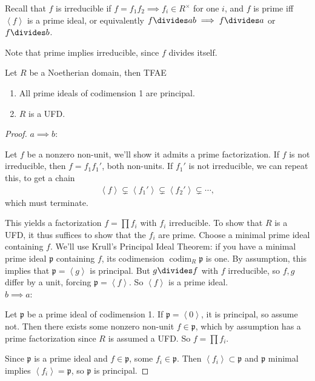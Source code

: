 Recall that \(f\) is irreducible if
\(f = f_1 f_2 \implies f_i \in R^{\times}\) for one \(i\), and \(f\) is
prime iff \(\left\langle{f}\right\rangle\) is a prime ideal, or
equivalently \(f\divides ab \implies f\divides a\) or \(f\divides b\).

Note that prime implies irreducible, since \(f\) divides itself.

\begin{proposition}[?]

Let \(R\) be a Noetherian domain, then TFAE

\begin{enumerate}
\def\labelenumi{\alph{enumi}.}
\item
  All prime ideals of codimension 1 are principal.
\item
  \(R\) is a UFD.
\end{enumerate}

\end{proposition}

\begin{proof}

\(a\implies b\):

Let \(f\) be a nonzero non-unit, we'll show it admits a prime
factorization. If \(f\) is not irreducible, then \(f = f_1 f_1'\), both
non-units. If \(f_1'\) is not irreducible, we can repeat this, to get a
chain
\begin{align*}  
\left\langle{f}\right\rangle \subsetneq \left\langle{f_1'}\right\rangle \subsetneq \left\langle{f_2'}\right\rangle \subsetneq \cdots
,\end{align*}
which must terminate.

This yields a factorization \(f = \prod f_i\) with \(f_i\) irreducible.
To show that \(R\) is a UFD, it thus suffices to show that the \(f_i\)
are prime. Choose a minimal prime ideal containing \(f\). We'll use
Krull's Principal Ideal Theorem: if you have a minimal prime ideal
\({\mathfrak{p}}\) containing \(f\), its codimension
\(\operatorname{codim}_R {\mathfrak{p}}\) is one. By assumption, this
implies that \({\mathfrak{p}}= \left\langle{g}\right\rangle\) is
principal. But \(g\divides f\) with \(f\) irreducible, so \(f,g\) differ
by a unit, forcing \({\mathfrak{p}}= \left\langle{f}\right\rangle\). So
\(\left\langle{f}\right\rangle\) is a prime ideal.\\

\(b\implies a\):

Let \({\mathfrak{p}}\) be a prime ideal of codimension 1. If
\({\mathfrak{p}}= \left\langle{0}\right\rangle\), it is principal, so
assume not. Then there exists some nonzero non-unit
\(f\in {\mathfrak{p}}\), which by assumption has a prime factorization
since \(R\) is assumed a UFD. So \(f=\prod f_i\).

Since \({\mathfrak{p}}\) is a prime ideal and \(f\in{\mathfrak{p}}\),
some \(f_i\in {\mathfrak{p}}\). Then
\(\left\langle{f_i}\right\rangle \subset {\mathfrak{p}}\) and
\({\mathfrak{p}}\) minimal implies
\(\left\langle{f_i}\right\rangle = {\mathfrak{p}}\), so
\({\mathfrak{p}}\) is principal.

\end{proof}


